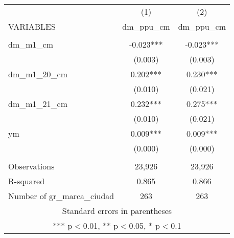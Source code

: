 \begin{tabular}{lcc} \hline
 & (1) & (2) \\
VARIABLES & dm\_ppu\_cm & dm\_ppu\_cm \\ \hline
 &  &  \\
dm\_m1\_cm & -0.023*** & -0.023*** \\
 & (0.003) & (0.003) \\
dm\_m1\_20\_cm & 0.202*** & 0.230*** \\
 & (0.010) & (0.021) \\
dm\_m1\_21\_cm & 0.232*** & 0.275*** \\
 & (0.010) & (0.021) \\
ym & 0.009*** & 0.009*** \\
 & (0.000) & (0.000) \\
 &  &  \\
Observations & 23,926 & 23,926 \\
R-squared & 0.865 & 0.866 \\
 Number of gr\_marca\_ciudad & 263 & 263 \\ \hline
\multicolumn{3}{c}{ Standard errors in parentheses} \\
\multicolumn{3}{c}{ *** p$<$0.01, ** p$<$0.05, * p$<$0.1} \\
\end{tabular}
